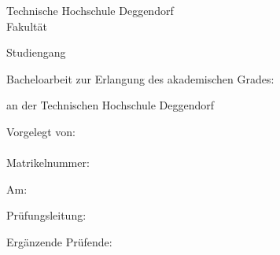 \begin{titlepage}
\begin{center}
	{
	Technische Hochschule Deggendorf\\
	Fakultät \faculty\par}
	\vspace{.2cm}
{\Large Studiengang \studies\\}
\vspace{6\baselineskip}
{\Huge{}\thesistitleDE\par}
\vspace{1cm}
{\Huge{}\thesistitleEN\par}
\vspace{6\baselineskip}

Bacheloarbeit zur Erlangung des akademischen Grades:

	\vspace{.2cm}
	\emph{\degree}
	\vspace{.2cm}

an der Technischen Hochschule Deggendorf\\
\end{center}
\vfill
\parbox[t]{.4\textwidth}{
	Vorgelegt von:\\
	\student\\
	Matrikelnummer: \matrnr\par
	\ifthenelse{\equal{\stammnr}{}}{}
	\vspace{\baselineskip}
	Am: \submissiondate\par
}
\hfill
\parbox[t]{.4\textwidth}{
Prüfungsleitung:\\
\supervisor%

\ifthenelse{\equal{\secsupervisor}{}}{}
{%
\vspace{\baselineskip}
Ergänzende Prüfende:\\
\secsupervisor%
}}
\end{titlepage}
\cleardoublepage\par
